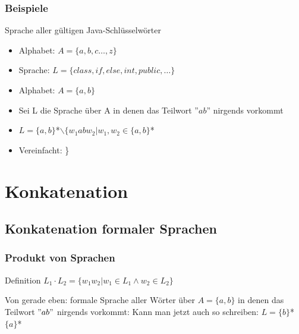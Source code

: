 \documentclass{beamer}
\begin{document}
\begin{frame}
\frametitle{Beispiele}
\begin{example}
Sprache aller gültigen Java-Schlüsselwörter
\begin{itemize}[<+->]
  \item Alphabet: $A = \{a,b,c\ldots,z\}$
  \item Sprache: $L =   \{class, if, else, int, public, \ldots\}$
\end{itemize}
\end{example}
\begin{example}
\begin{itemize}[<+->]
  \item Alphabet: $A = \{a,b\}$
  \item Sei L die Sprache über A in denen das Teilwort ''$ab$'' nirgends vorkommt
  \item $L = \{a,b\}$*$\backslash\{w_{1}abw_{2}|w_{1},w_{2}\in\{a,b\}$*
  \item Vereinfacht:
  \}
\end{itemize}
\end{example}
\end{frame}

\section{Konkatenation}
\subsection[Konkatenation formaler Sprachen]{Konkatenation formaler Sprachen}
\begin{frame}
\frametitle{Produkt von Sprachen}
\begin{block}{Definition}
$L_{1}\cdot L_{2} = \{w_{1}w_{2}|w_{1} \in L_{1} \land w_{2} \in L_{2}\}$
\end{block}
\begin{example}
Von gerade eben: formale Sprache aller Wörter über $A=\{a,b\}$ in denen das
Teilwort $"ab"$ nirgends vorkommt: \newline
Kann man jetzt auch so schreiben: $L = \{b\}$*$\{a\}$*
\end{example}
\end{frame}
\end{document}
